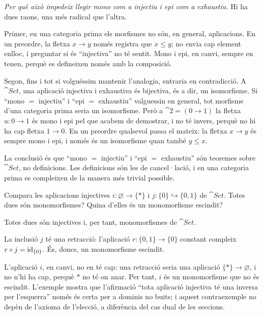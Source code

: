 \begin{solucio}
\emph{Per què això impedeix llegir mono com a injectiu i epi com a exhaustiu.} Hi ha dues raons, una més radical que l'altra.

Primer, en una categoria prima els morfismes no són, en general, aplicacions. En un preordre, la fletxa $x\to y$ només registra que $x\le y$; no envia cap element enlloc, i preguntar si és \enquote{injectiva} no té sentit. Mono i epi, en canvi, sempre en tenen, perquè es defineixen només amb la composició.

Segon, fins i tot si volguéssim mantenir l'analogia, entraria en contradicció. A $\cat{Set}$, una aplicació injectiva i exhaustiva és bijectiva, és a dir, un isomorfisme. Si \enquote{mono $=$ injectiu} i \enquote{epi $=$ exhaustiu} valguessin en general, tot morfisme d'una categoria prima seria un isomorfisme. Però a $\cat{2}=(0\to 1)$ la fletxa $u\colon 0\to 1$ és mono i epi pel que acabem de demostrar, i no té invers, perquè no hi ha cap fletxa $1\to 0$. En un preordre qualsevol passa el mateix: la fletxa $x\to y$ és sempre mono i epi, i només és un isomorfisme quan també $y\le x$.

La conclusió és que \enquote{mono $=$ injectiu} i \enquote{epi $=$ exhaustiu} són teoremes sobre $\cat{Set}$, no definicions. Les definicions són les de cancel·lació, i en una categoria prima es compleixen de la manera més trivial possible.
\end{solucio}

\begin{exercici}\label{pr-mono-no-escindit}
Compara les aplicacions injectives $i\colon\varnothing\to\{\ast\}$ i $j\colon\{0\}\hookrightarrow\{0,1\}$ de $\cat{Set}$. Totes dues són monomorfismes? Quina d'elles és un monomorfisme escindit?
\end{exercici}

\begin{solucio}
Totes dues són injectives i, per tant, monomorfismes de $\cat{Set}$.

La inclusió $j$ té una retracció: l'aplicació $r\colon\{0,1\}\to\{0\}$ constant compleix $r\circ j=\operatorname{id}_{\{0\}}$. És, doncs, un monomorfisme escindit.

L'aplicació $i$, en canvi, no en té cap: una retracció seria una aplicació $\{\ast\}\to\varnothing$, i no n'hi ha cap, perquè $\ast$ no té on anar. Per tant, $i$ és un monomorfisme que no és escindit. L'exemple mostra que l'afirmació \enquote{tota aplicació injectiva té una inversa per l'esquerra} només és certa per a dominis no buits; i aquest contraexemple no depèn de l'axioma de l'elecció, a diferència del cas dual de les seccions.
\end{solucio}

